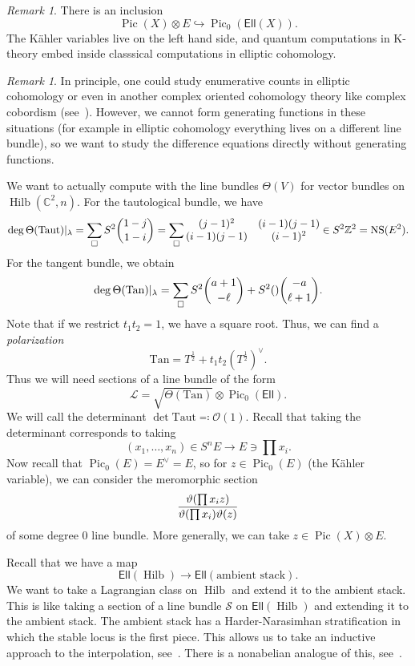 \documentclass[leqno, openany]{memoir}
\theoremstyle{definition}
\theoremstyle{remark}
\newtheorem{rmk}[thm]{Remark}
\theoremstyle{plain}
\theoremstyle{definition}
\theoremstyle{remark}
\newcommand{\C}{\mathbb{C}}
\newcommand{\Z}{\mathbb{Z}}
\newcommand{\mc}[1]{\mathcal{#1}}
\newcommand{\mr}[1]{\mathrm{#1}}
\newcommand{\ms}[1]{\mathsf{#1}}
\DeclareMathOperator{\Pic}{Pic}
\DeclareMathOperator{\Hilb}{Hilb}
\begin{document}
\begin{rmk}
    There is an inclusion
    \[ \Pic(X) \otimes E \hookrightarrow \Pic_0(\ms{Ell}(X)). \]
    The K\"ahler variables live on the left hand side, and quantum computations in K-theory embed inside classsical computations in elliptic cohomology.
\end{rmk}

\begin{rmk}
    In principle, one could study enumerative counts in elliptic cohomology or even in another complex oriented cohomology theory like complex cobordism (see~\cite{cobpt}). However, we cannot form generating functions in these situations (for example in elliptic cohomology everything lives on a different line bundle), so we want to study the difference equations directly without generating functions.
\end{rmk}

We want to actually compute with the line bundles $\Theta(V)$ for vector bundles on $\Hilb(\C^2, n)$. For the tautological bundle, we have
\[ \deg \Theta(\mr{Taut}) |_{\lambda} = \sum_{\square} S^2\binom{1-j}{1-i} = \sum_{\square} \mqty{(j-1)^2 & (i-1)(j-1) \\ (i-1)(j-1) & (i-1)^2} \in S^2 \Z^2 = \mr{NS}(E^2). \]
For the tangent bundle, we obtain
\[ \deg \Theta(\mr{Tan})|_{\lambda} = \sum_{\square} S^2 \binom{a+1}{-\ell} + S^2 \qty\binom{-a}{\ell+1}. \]
Note that if we restrict $t_1t_2 = 1$, we have a square root. Thus, we can find a \textit{polarization}
\[ \mr{Tan} = T^{\frac{1}{2}} + t_1 t_2 (T^{\frac{1}{2}})^{\vee}. \]
Thus we will need sections of a line bundle of the form
\[ \mc{L} = \sqrt{\Theta(\mr{Tan})} \otimes \Pic_0(\ms{Ell}). \]
We will call the determinant $\det \mr{Taut} \eqqcolon \mc{O}(1)$. Recall that taking the determinant corresponds to taking
\[ (x_1, \ldots, x_n) \in S^n E \to E \ni \prod x_i. \]
Now recall that $\Pic_0(E) = E^{\vee} = E$, so for $z \in \Pic_0(E)$ (the K\"ahler variable), we can consider the meromorphic section
\[ \frac{\vartheta\qty(\prod x_i z)}{\vartheta\qty(\prod x_i) \vartheta(z)} \]
of some degree $0$ line bundle. More generally, we can take $z \in \Pic(X) \otimes E$.

Recall that we have a map
\[ \ms{Ell}(\Hilb) \to \ms{Ell}(\text{ambient stack}). \]
We want to take a Lagrangian class on $\Hilb$ and extend it to the ambient stack. This is like taking a section of a line bundle $\mc{S}$ on $\ms{Ell}(\Hilb)$ and extending it to the ambient stack. The ambient stack has a Harder-Narasimhan stratification in which the stable locus is the first piece. This allows us to take an inductive approach to the interpolation, see~\cite{indconststab}. There is a nonabelian analogue of this, see~\cite{nonabstab}.
\end{document}
